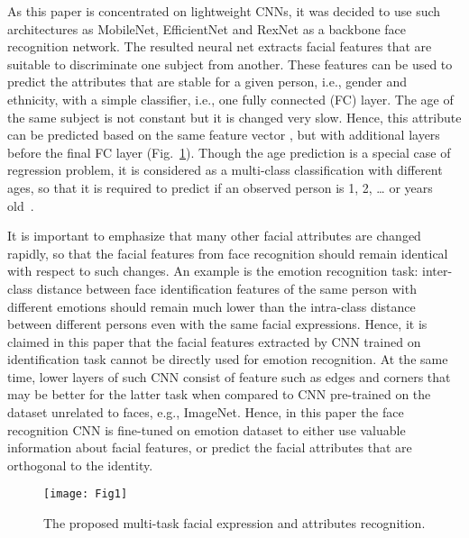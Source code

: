 \documentclass[runningheads]{llncs}
\begin{document}
As this paper is concentrated on lightweight CNNs, it was decided to use such architectures as MobileNet, EfficientNet and RexNet as a backbone face recognition network. The resulted neural net extracts facial features  that are suitable to discriminate one subject from another. These features can be used to predict the attributes that are stable for a given person, i.e., gender and ethnicity, with a simple classifier, i.e., one fully connected (FC) layer. The age of the same subject is not constant but it is changed very slow. Hence, this attribute can be predicted based on the same feature vector , but with additional layers before the final FC layer (Fig.~\ref{fig:2}). Though the age prediction is a special case of regression problem, it is considered as a multi-class classification with  different ages, so that it is required to predict if an observed person is 1, 2, … or  years old~\cite{savchenko2019peerj}.

It is important to emphasize that many other facial attributes are changed rapidly, so that the facial features from face recognition should remain identical with respect to such changes. An example is the emotion recognition task: inter-class distance between face identification features of the same person with different emotions should remain much lower than the intra-class distance between different persons even with the same facial expressions. Hence, it is claimed in this paper that the facial features extracted by CNN trained on identification task cannot be directly used for emotion recognition. At the same time, lower layers of such CNN consist of feature such as edges and corners that may be better for the latter task when compared to CNN pre-trained on the dataset unrelated to faces, e.g., ImageNet. Hence, in this paper the face recognition CNN is fine-tuned on emotion dataset to either use valuable information about facial features, or predict the facial attributes that are orthogonal to the identity. 

\begin{figure}[t]
\center
\texttt{[image: Fig1]}
\caption{The proposed multi-task facial expression and attributes recognition.} \label{fig:2}
\end{figure}
\end{document}
